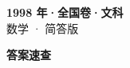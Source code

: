 \documentclass[zihao=-4, a4paper]{ctexart}
\begin{document}
\begin{center}
  {\Large\bfseries 1998 年·全国卷·文科}\\[4pt]
  {\large 数学 · 简答版}
\end{center}
\medskip
{}

\clearpage
{}
\begin{center}{\Large\bfseries 答案速查}\end{center}
\medskip

\end{document}
